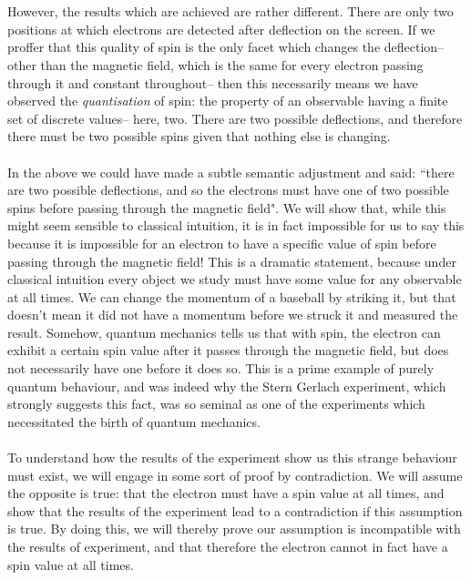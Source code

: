 \\\\
However, the results which are achieved are rather different. There are only two positions at which electrons are detected after deflection on the screen. If we proffer that this quality of spin is the only facet which changes the deflection-- other than the magnetic field, which is the same for every electron passing through it and constant throughout-- then this necessarily means we have observed the \textit{quantisation} of spin: the property of an observable having a finite set of discrete values-- here, two. There are two possible deflections, and therefore there must be two possible spins given that nothing else is changing.
\\\\
In the above we could have made a subtle semantic adjustment and said: ``there are two possible deflections, and so the electrons must have one of two possible spins before passing through the magnetic field". We will show that, while this might seem sensible to classical intuition, it is in fact impossible for us to say this because it is impossible for an electron to have a specific value of spin before passing through the magnetic field! This is a dramatic statement, because under classical intuition every object we study must have some value for any observable at all times. We can change the momentum of a baseball by striking it, but that doesn't mean it did not have a momentum before we struck it and measured the result. Somehow, quantum mechanics tells us that with spin, the electron can exhibit a certain spin value after it passes through the magnetic field, but does not necessarily have one before it does so. This is a prime example of purely quantum behaviour, and was indeed why the Stern Gerlach experiment, which strongly suggests this fact, was so seminal as one of the experiments which necessitated the birth of quantum mechanics.
\\\\
To understand how the results of the experiment show us this strange behaviour must exist, we will engage in some sort of proof by contradiction. We will assume the opposite is true: that the electron must have a spin value at all times, and show that the results of the experiment lead to a contradiction if this assumption is true. By doing this, we will thereby prove our assumption is incompatible with the results of experiment, and that therefore the electron cannot in fact have a spin value at all times.
\\\\
